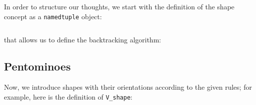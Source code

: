 In order to structure our thoughts, we start with the definition of the shape
concept as a \verb|namedtuple| object:
\inputminted[fontsize=\small,stripnl=false,firstline=4, lastline=6]{python}{backtracking/polyominoes.py}
that allows us to define the backtracking algorithm:


\subsection{Pentominoes}

Now, we introduce shapes with their orientations according to the given rules;
for example, here is the definition of \verb|V_shape|:
\inputminted[fontsize=\small,stripnl=false,firstline=193, lastline=205]{python}{backtracking/polyominoes.py}

